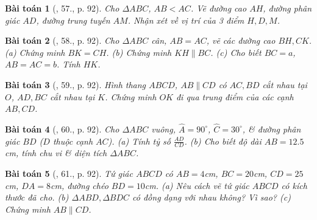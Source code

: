 \documentclass{article}
\newtheorem{baitoan}{Bài toán}
\begin{document}
\begin{baitoan}[\cite{SGK_Toan_8_tap_2}, 57., p. 92]
	Cho $\Delta ABC$, $AB < AC$. Vẽ đường cao $AH$, đường phân giác $AD$, đường trung tuyến $AM$. Nhận xét về vị trí của 3 điểm $H,D,M$.
\end{baitoan}

\begin{baitoan}[\cite{SGK_Toan_8_tap_2}, 58., p. 92]
	Cho $\Delta ABC$ cân, $AB = AC$, vẽ các đường cao $BH,CK$. (a) Chứng minh $BK = CH$. (b) Chứng minh $KH\parallel BC$. (c) Cho biết $BC = a$, $AB = AC = b$. Tính $HK$.
\end{baitoan}

\begin{baitoan}[\cite{SGK_Toan_8_tap_2}, 59., p. 92]
	Hình thang $ABCD$, $AB\parallel CD$ có $AC,BD$ cắt nhau tại $O$, $AD,BC$ cắt nhau tại $K$. Chứng minh $OK$ đi qua trung điểm của các cạnh $AB,CD$.
\end{baitoan}

\begin{baitoan}[\cite{SGK_Toan_8_tap_2}, 60., p. 92]
	Cho $\Delta ABC$ vuông, $\widehat{A} = 90^\circ$, $\widehat{C} = 30^\circ$, \& đường phân giác $BD$ ($D$ thuộc cạnh $AC$). (a) Tính tỷ số $\frac{AD}{CD}$. (b) Cho biết độ dài $AB = 12.5$\emph{cm}, tính chu vi \& diện tích $\Delta ABC$.
\end{baitoan}

\begin{baitoan}[\cite{SGK_Toan_8_tap_2}, 61., p. 92]
	Tứ giác $ABCD$ có $AB = 4$\emph{cm}, $BC = 20$\emph{cm}, $CD = 25$\emph{cm}, $DA = 8$\emph{cm}, đường chéo $BD = 10$\emph{cm}. (a) Nêu cách vẽ tứ giác $ABCD$ có kích thước đã cho. (b) $\Delta ABD,\Delta BDC$ có đồng dạng với nhau không? Vì sao? (c) Chứng minh $AB\parallel CD$.	
\end{baitoan}


\printbibliography[heading=bibintoc]
	
\end{document}
